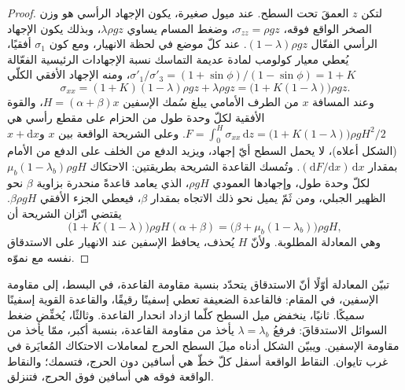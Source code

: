 \begin{proof}
لتكن $z$ العمقَ تحت السطح. عند ميول صغيرة، يكون الإجهاد الرأسي
هو وزن الصخر الواقع فوقه، $\sigma_{zz} = \rho g z$، وضغط المسام
يساوي $\lambda\rho g z$، وبذلك يكون الإجهاد الرأسي الفعّال
$(1 - \lambda)\rho g z$. عند كلّ موضع في لحظة الانهيار، ومع كون $\sigma_1$ أفقيًا،
يُعطي معيار كولومب لمادة عديمة التماسك نسبة
الإجهادات الرئيسية الفعّالة $\sigma'_1/\sigma'_3 = (1 + \sin\phi)/(1 -
\sin\phi) = 1 + K$، ومنه الإجهاد الأفقي الكلّي
\[
  \sigma_{xx} = (1 + K)(1 - \lambda)\rho g z + \lambda\rho g z
  = \bigl(1 + K(1 - \lambda)\bigr)\rho g z .
\]
وعند المسافة $x$ من الطرف الأمامي يبلغ سُمك الإسفين $H = (\alpha +
\beta)x$، والقوة الأفقية لكلّ وحدة طول من الحزام على
مقطع رأسي هي $F = \int_0^H \sigma_{xx}\,\mathrm dz = \bigl(1 + K(1 -
\lambda)\bigr)\rho g H^2/2$. وعلى الشريحة الواقعة بين $x$ و$x + \mathrm dx$
(الشكل أعلاه)، لا يحمل السطح أيّ إجهاد، ويزيد الدفع من الخلف
على الدفع من الأمام بمقدار $(\mathrm dF/\mathrm dx)\,\mathrm dx$.
وتُمسك القاعدة الشريحة بطريقتين: الاحتكاك $\mu_b(1 -
\lambda_b)\rho g H$ لكلّ وحدة طول، وإجهادها العمودي $\rho g H$، الذي
يعامد قاعدةً منحدرة بزاوية $\beta$ نحو الظهير الجبلي، ومن ثَمّ يميل
نحو ذلك الاتجاه بمقدار $\beta$، فيعطي الجزء الأفقي $\beta\rho g H$.
يقتضي اتّزان الشريحة أن
\[
  \bigl(1 + K(1 - \lambda)\bigr)\rho g H(\alpha + \beta)
  = \bigl(\beta + \mu_b(1 - \lambda_b)\bigr)\rho g H ,
\]
وهي المعادلة المطلوبة. ولأنّ $H$ يُحذف، يحافظ الإسفين عند الانهيار على
الاستدقاق نفسه مع نموّه.
\end{proof}

تبيّن المعادلة أوّلًا أنّ الاستدقاق يتحدّد بنسبة مقاومة القاعدة، في البسط،
إلى مقاومة الإسفين، في المقام: فالقاعدة الضعيفة تعطي إسفينًا رقيقًا،
والقاعدة القوية إسفينًا سميكًا.
ثانيًا، ينخفض ميل السطح كلّما ازداد انحدار القاعدة. وثالثًا، يُخفِّض ضغط السوائل
الاستدقاقَ: فرفعُ $\lambda = \lambda_b$ يأخذ من مقاومة القاعدة، بنسبة أكبر،
ممّا يأخذ من مقاومة الإسفين. ويبيّن الشكل أدناه ميلَ السطح الحرج
لمعاملات الاحتكاك المُعايَرة في غرب تايوان. النقاط الواقعة أسفل كلّ خطّ
هي أسافين دون الحرج، فتسمك؛
والنقاط الواقعة فوقه هي أسافين فوق الحرج، فتنزلق.


